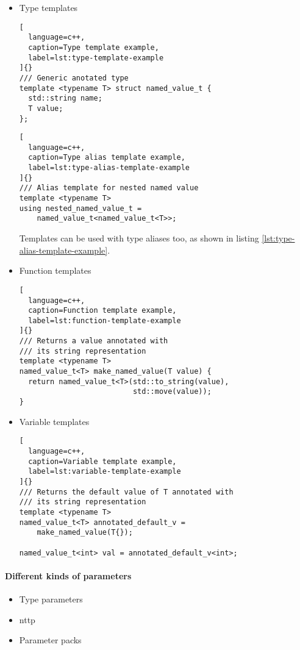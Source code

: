\documentclass[../main]{subfiles}
\begin{document}
\begin{itemize}
\item Type templates

\begin{lstlisting}[
  language=c++,
  caption=Type template example,
  label=lst:type-template-example
]{}
/// Generic anotated type
template <typename T> struct named_value_t {
  std::string name;
  T value;
};
\end{lstlisting}

\begin{lstlisting}[
  language=c++,
  caption=Type alias template example,
  label=lst:type-alias-template-example
]{}
/// Alias template for nested named value
template <typename T>
using nested_named_value_t =
    named_value_t<named_value_t<T>>;
\end{lstlisting}

Templates can be used with type aliases too, as shown in
listing \ref{lst:type-alias-template-example}.

\item Function templates

\begin{lstlisting}[
  language=c++,
  caption=Function template example,
  label=lst:function-template-example
]{}
/// Returns a value annotated with
/// its string representation
template <typename T>
named_value_t<T> make_named_value(T value) {
  return named_value_t<T>(std::to_string(value),
                          std::move(value));
}
\end{lstlisting}

\item Variable templates

\begin{lstlisting}[
  language=c++,
  caption=Variable template example,
  label=lst:variable-template-example
]{}
/// Returns the default value of T annotated with
/// its string representation
template <typename T>
named_value_t<T> annotated_default_v =
    make_named_value(T{});

named_value_t<int> val = annotated_default_v<int>;
\end{lstlisting}

\end{itemize}

\paragraph{Different kinds of parameters}

\begin{itemize}
\item Type parameters
\item \acrfull{nttp}
\item Parameter packs
\end{itemize}
\end{document}

